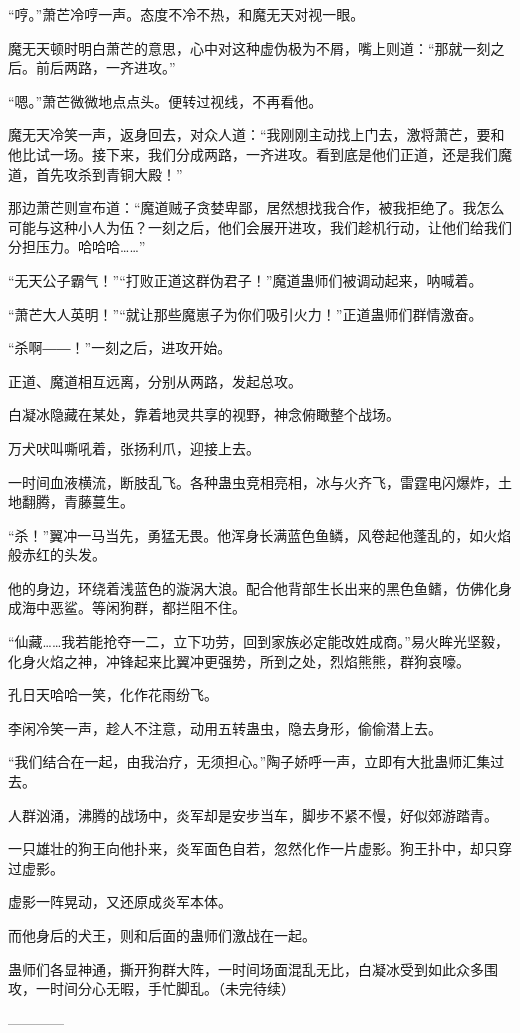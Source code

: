 \begin{this_body}
“哼。”萧芒冷哼一声。态度不冷不热，和魔无天对视一眼。

魔无天顿时明白萧芒的意思，心中对这种虚伪极为不屑，嘴上则道：“那就一刻之后。前后两路，一齐进攻。”

“嗯。”萧芒微微地点点头。便转过视线，不再看他。

魔无天冷笑一声，返身回去，对众人道：“我刚刚主动找上门去，激将萧芒，要和他比试一场。接下来，我们分成两路，一齐进攻。看到底是他们正道，还是我们魔道，首先攻杀到青铜大殿！”

那边萧芒则宣布道：“魔道贼子贪婪卑鄙，居然想找我合作，被我拒绝了。我怎么可能与这种小人为伍？一刻之后，他们会展开进攻，我们趁机行动，让他们给我们分担压力。哈哈哈……”

“无天公子霸气！”“打败正道这群伪君子！”魔道蛊师们被调动起来，呐喊着。

“萧芒大人英明！”“就让那些魔崽子为你们吸引火力！”正道蛊师们群情激奋。

“杀啊――！”一刻之后，进攻开始。

正道、魔道相互远离，分别从两路，发起总攻。

白凝冰隐藏在某处，靠着地灵共享的视野，神念俯瞰整个战场。

万犬吠叫嘶吼着，张扬利爪，迎接上去。

一时间血液横流，断肢乱飞。各种蛊虫竞相亮相，冰与火齐飞，雷霆电闪爆炸，土地翻腾，青藤蔓生。

“杀！”翼冲一马当先，勇猛无畏。他浑身长满蓝色鱼鳞，风卷起他蓬乱的，如火焰般赤红的头发。

他的身边，环绕着浅蓝色的漩涡大浪。配合他背部生长出来的黑色鱼鳍，仿佛化身成海中恶鲨。等闲狗群，都拦阻不住。

“仙藏……我若能抢夺一二，立下功劳，回到家族必定能改姓成商。”易火眸光坚毅，化身火焰之神，冲锋起来比翼冲更强势，所到之处，烈焰熊熊，群狗哀嚎。

孔日天哈哈一笑，化作花雨纷飞。

李闲冷笑一声，趁人不注意，动用五转蛊虫，隐去身形，偷偷潜上去。

“我们结合在一起，由我治疗，无须担心。”陶子娇呼一声，立即有大批蛊师汇集过去。

人群汹涌，沸腾的战场中，炎军却是安步当车，脚步不紧不慢，好似郊游踏青。

一只雄壮的狗王向他扑来，炎军面色自若，忽然化作一片虚影。狗王扑中，却只穿过虚影。

虚影一阵晃动，又还原成炎军本体。

而他身后的犬王，则和后面的蛊师们激战在一起。

蛊师们各显神通，撕开狗群大阵，一时间场面混乱无比，白凝冰受到如此众多围攻，一时间分心无暇，手忙脚乱。（未完待续）

------------

\end{this_body}

